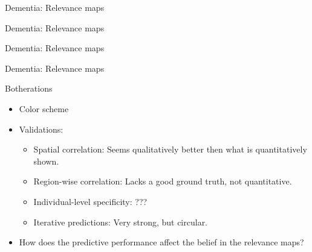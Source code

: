 \documentclass[c]{beamer}
\begin{document}
%			
	
	\begin{frame}{Dementia: Relevance maps} %
	\end{frame}
	
	\begin{frame}{Dementia: Relevance maps} %
	\end{frame}
	
	\begin{frame}{Dementia: Relevance maps} %
	\end{frame}
	
	\begin{frame}{Dementia: Relevance maps} %
	\end{frame}
	
	\begin{frame}{Botherations}
		\begin{itemize}
			\item Color scheme
			\item Validations:
				\begin{itemize}
					\item Spatial correlation: Seems qualitatively better then what is quantitatively shown.
					\item Region-wise correlation: Lacks a good ground truth, not quantitative.
					\item Individual-level specificity: ???
					\item Iterative predictions: Very strong, but circular.
				\end{itemize}
			\item How does the predictive performance affect the belief in the relevance maps?
		\end{itemize}
	\end{frame}
\end{document}
